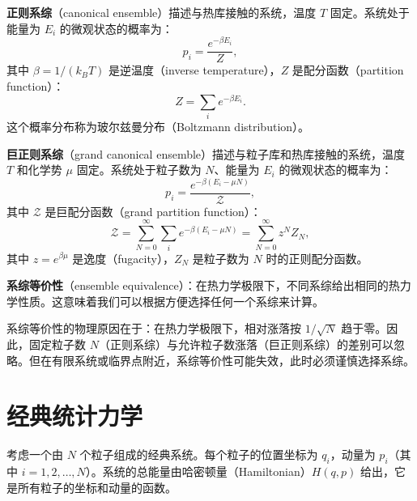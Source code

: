 \begin{definition}[正则系综]
\textbf{正则系综}（canonical ensemble）描述与热库接触的系统，温度 $T$ 固定。系统处于能量为 $E_i$ 的微观状态的概率为：
\begin{equation}
    p_i = \frac{e^{-\beta E_i}}{Z},
\end{equation}
其中 $\beta = 1/(k_B T)$ 是逆温度（inverse temperature），$Z$ 是配分函数（partition function）：
\begin{equation}
    Z = \sum_i e^{-\beta E_i}.
\end{equation}
这个概率分布称为玻尔兹曼分布（Boltzmann distribution）。
\end{definition}

\begin{definition}[巨正则系综]
\textbf{巨正则系综}（grand canonical ensemble）描述与粒子库和热库接触的系统，温度 $T$ 和化学势 $\mu$ 固定。系统处于粒子数为 $N$、能量为 $E_i$ 的微观状态的概率为：
\begin{equation}
    p_i = \frac{e^{-\beta (E_i - \mu N)}}{\mathcal{Z}},
\end{equation}
其中 $\mathcal{Z}$ 是巨配分函数（grand partition function）：
\begin{equation}
    \mathcal{Z} = \sum_{N=0}^{\infty} \sum_i e^{-\beta (E_i - \mu N)} = \sum_{N=0}^{\infty} z^N Z_N,
\end{equation}
其中 $z = e^{\beta \mu}$ 是逸度（fugacity），$Z_N$ 是粒子数为 $N$ 时的正则配分函数。
\end{definition}

\begin{property}[系综等价性]
\textbf{系综等价性}（ensemble equivalence）：在热力学极限下，不同系综给出相同的热力学性质。这意味着我们可以根据方便选择任何一个系综来计算。
\end{property}

\begin{remark}
系综等价性的物理原因在于：在热力学极限下，相对涨落按 $1/\sqrt{N}$ 趋于零。因此，固定粒子数 $N$（正则系综）与允许粒子数涨落（巨正则系综）的差别可以忽略。但在有限系统或临界点附近，系综等价性可能失效，此时必须谨慎选择系综。
\end{remark}

\section{经典统计力学}

考虑一个由 $N$ 个粒子组成的经典系统。每个粒子的位置坐标为 $q_i$，动量为 $p_i$（其中 $i = 1, 2, \ldots, N$）。系统的总能量由哈密顿量（Hamiltonian）$H(q, p)$ 给出，它是所有粒子的坐标和动量的函数。

